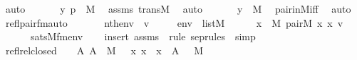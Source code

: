 \begin{isabellebody}
\ auto\ \isanewline
\ \ \isamarkupfalse%
\ \isamarkupfalse%
\ {\isachardoublequoteopen}{\isacharless}{\kern0pt}y{\isacharcomma}{\kern0pt}\ p{\isachargreater}{\kern0pt}\ {\isasymin}\ M{\isachardoublequoteclose}\ \isamarkupfalse%
\ assms\ transM\ \isamarkupfalse%
\ auto\ \isanewline
\ \ \isamarkupfalse%
\ \isamarkupfalse%
\ {\isachardoublequoteopen}y\ {\isasymin}\ M{\isachardoublequoteclose}\ \isamarkupfalse%
\ pair{\isacharunderscore}{\kern0pt}in{\isacharunderscore}{\kern0pt}M{\isacharunderscore}{\kern0pt}iff\ \isamarkupfalse%
\ auto\ \isanewline
{}\isamarkupfalse%
%
\endisatagproof
{\isafoldproof}%
%
\isadelimproof
\isanewline
%
\endisadelimproof
\isanewline
{}\isamarkupfalse%
\ refl{\isacharunderscore}{\kern0pt}pair{\isacharunderscore}{\kern0pt}fm{\isacharunderscore}{\kern0pt}auto{\isacharcolon}{\kern0pt}\isanewline
\ \ \isanewline
\ \ \ \ {\isachardoublequoteopen}nth{\isacharparenleft}{\kern0pt}{}{\isacharcomma}{\kern0pt}env{\isacharparenright}{\kern0pt}\ {\isacharequal}{\kern0pt}\ v{\isachardoublequoteclose}\ \isanewline
\ \ \ \ {\isachardoublequoteopen}env\ {\isasymin}\ list{\isacharparenleft}{\kern0pt}M{\isacharparenright}{\kern0pt}{\isachardoublequoteclose}\isanewline
\ \isanewline
\ \ \ \ {\isachardoublequoteopen}{\isacharparenleft}{\kern0pt}{\isasymexists}x\ {\isasymin}\ M{\isachardot}{\kern0pt}\ pair{\isacharparenleft}{\kern0pt}{\isacharhash}{\kern0pt}{\isacharhash}{\kern0pt}M{\isacharcomma}{\kern0pt}\ x{\isacharcomma}{\kern0pt}\ x{\isacharcomma}{\kern0pt}\ v{\isacharparenright}{\kern0pt}{\isacharparenright}{\kern0pt}\ \isanewline
\ \ \ \ \ {\isasymlongleftrightarrow}\ sats{\isacharparenleft}{\kern0pt}M{\isacharcomma}{\kern0pt}{\isacharquery}{\kern0pt}fm{\isacharparenleft}{\kern0pt}{}{\isacharparenright}{\kern0pt}{\isacharcomma}{\kern0pt}env{\isacharparenright}{\kern0pt}{\isachardoublequoteclose}\isanewline
%
\isadelimproof
\ \ %
\endisadelimproof
%
\isatagproof
{}\isamarkupfalse%
\ {\isacharparenleft}{\kern0pt}insert\ assms\ {\isacharsemicolon}{\kern0pt}\ {\isacharparenleft}{\kern0pt}rule\ sep{\isacharunderscore}{\kern0pt}rules\ {\isacharbar}{\kern0pt}\ simp{\isacharparenright}{\kern0pt}{\isacharplus}{\kern0pt}{\isacharparenright}{\kern0pt}%
\endisatagproof
{\isafoldproof}%
%
\isadelimproof
\isanewline
%
\endisadelimproof
\isanewline
{}\isamarkupfalse%
\ refl{\isacharunderscore}{\kern0pt}rel{\isacharunderscore}{\kern0pt}closed\ {\isacharcolon}{\kern0pt}\ \ {\isachardoublequoteopen}{\isasymAnd}\ A{\isachardot}{\kern0pt}\ A\ {\isasymin}\ M\ {\isasymLongrightarrow}\ {\isacharbraceleft}{\kern0pt}\ {\isacharless}{\kern0pt}x{\isacharcomma}{\kern0pt}\ x{\isachargreater}{\kern0pt}\ {\isachardot}{\kern0pt}\ x\ {\isasymin}\ A\ {\isacharbraceright}{\kern0pt}\ {\isasymin}\ M{\isachardoublequoteclose}\ \isanewline

\end{isabellebody}
